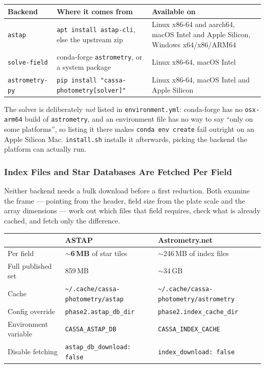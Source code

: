 \documentclass[11pt,a4paper]{article}
\begin{document}
\begin{center}
\begin{tabularx}{\textwidth}{|l|X|X|}
\hline
\textbf{Backend} & \textbf{Where it comes from} & \textbf{Available on} \\
\hline
\texttt{astap} & \texttt{apt install astap-cli}, else the upstream zip & Linux x86-64 and aarch64, macOS Intel and Apple Silicon, Windows x64/x86/ARM64 \\
\hline
\texttt{solve-field} & conda-forge \texttt{astrometry}, or a system package & Linux x86-64, macOS Intel \\
\hline
\texttt{astrometry-py} & \texttt{pip install "cassa-photometry[solver]"} & Linux x86-64, macOS Intel and Apple Silicon \\
\hline
\end{tabularx}
\end{center}

The solver is deliberately \emph{not} listed in \texttt{environment.yml}:
conda-forge has no \texttt{osx-arm64} build of \texttt{astrometry}, and an
environment file has no way to say ``only on some platforms'', so listing it
there makes \texttt{conda env create} fail outright on an Apple Silicon Mac.
\texttt{install.sh} installs it afterwards, picking the backend the platform can
actually run.

\subsubsection{Index Files and Star Databases Are Fetched Per Field}
Neither backend needs a bulk download before a first reduction. Both examine the
frame --- pointing from the header, field size from the plate scale and the
array dimensions --- work out which files that field requires, check what is
already cached, and fetch only the difference.

\begin{center}
\begin{tabularx}{\textwidth}{|l|X|X|}
\hline
& \textbf{ASTAP} & \textbf{Astrometry.net} \\
\hline
Per field & $\sim$\textbf{6\,MB} of star tiles & $\sim$246\,MB of index files \\
\hline
Full published set & 859\,MB & $\sim$34\,GB \\
\hline
Cache & \texttt{\textasciitilde/.cache/}\allowbreak\texttt{cassa-photometry/}\allowbreak\texttt{astap} & \texttt{\textasciitilde/.cache/}\allowbreak\texttt{cassa-photometry/}\allowbreak\texttt{astrometry} \\
\hline
Config override & \texttt{phase2.astap\_db\_dir} & \texttt{phase2.index\_cache\_dir} \\
\hline
Environment variable & \texttt{CASSA\_ASTAP\_DB} & \texttt{CASSA\_INDEX\_CACHE} \\
\hline
Disable fetching & \texttt{astap\_db\_download: false} & \texttt{index\_download: false} \\
\hline
\end{tabularx}
\end{center}
\end{document}
